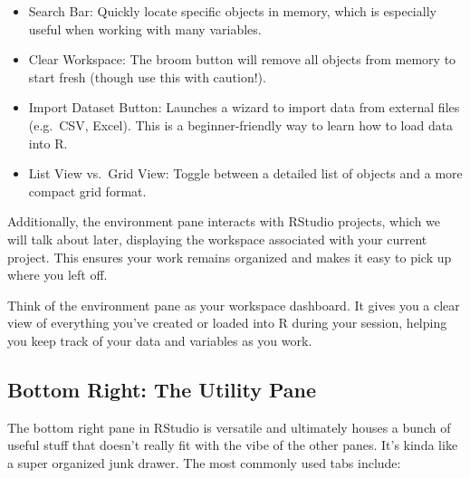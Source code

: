\documentclass[
  letterpaper,
]{book}
\providecommand{\tightlist}{%
  \setlength{\itemsep}{0pt}\setlength{\parskip}{0pt}}\usepackage{longtable,booktabs,array}
\begin{document}
\begin{itemize}
\tightlist
\item
  Search Bar: Quickly locate specific objects in memory, which is
  especially useful when working with many variables.
\item
  Clear Workspace: The broom button will remove all objects from memory
  to start fresh (though use this with caution!).
\item
  Import Dataset Button: Launches a wizard to import data from external
  files (e.g.~CSV, Excel). This is a beginner-friendly way to learn how
  to load data into R.
\item
  List View vs.~Grid View: Toggle between a detailed list of objects and
  a more compact grid format.
\end{itemize}

Additionally, the environment pane interacts with RStudio projects,
which we will talk about later, displaying the workspace associated with
your current project. This ensures your work remains organized and makes
it easy to pick up where you left off.

Think of the environment pane as your workspace dashboard. It gives you
a clear view of everything you've created or loaded into R during your
session, helping you keep track of your data and variables as you work.

\subsection{Bottom Right: The Utility
Pane}\label{bottom-right-the-utility-pane}

The bottom right pane in RStudio is versatile and ultimately houses a
bunch of useful stuff that doesn't really fit with the vibe of the other
panes. It's kinda like a super organized junk drawer. The most commonly
used tabs include:
\end{document}
